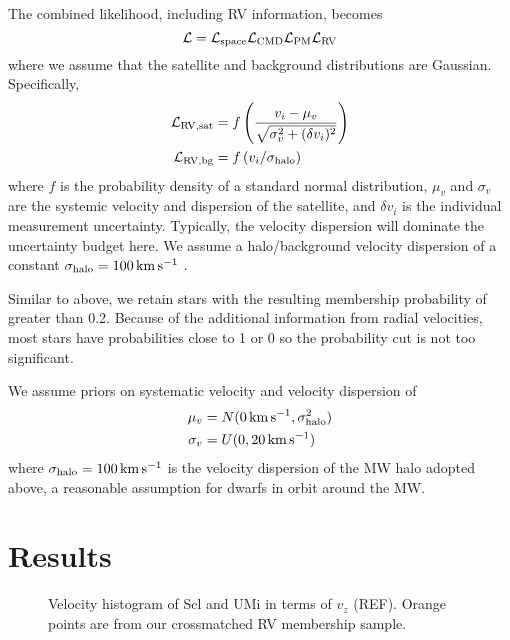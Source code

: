 The combined likelihood, including RV information, becomes
\begin{equation}{
{\cal L} = {\cal L}_{\rm space} {\cal L}_{\rm CMD} {\cal L}_{\rm PM} {\cal L}_{\rm RV}
}\end{equation} where we assume that the satellite and background
distributions are Gaussian. Specifically, \begin{equation}{
\begin{split}
{\cal L}_{\rm RV, sat} &= f\left( \frac{v_i -\mu_{v}}{\sqrt{\sigma_{v}^2 + (\delta v_i)^2}}\right) \\
{\cal L}_{\rm RV, bg} &= f\left( v_i /  \sigma_{\rm halo} \right)
\end{split}
}\end{equation} where \(f\) is the probability density of a standard
normal distribution, \(\mu_v\) and \(\sigma_v\) are the systemic
velocity and dispersion of the satellite, and \(\delta v_i\) is the
individual measurement uncertainty. Typically, the velocity dispersion
will dominate the uncertainty budget here. We assume a halo/background
velocity dispersion of a constant \(\sigma_{\rm halo} = 100\,{\rm km\,s^{-1}}\)
\citep[e.g.][]{brown+2010}.

Similar to above, we retain stars with the resulting membership
probability of greater than 0.2. Because of the additional information
from radial velocities, most stars have probabilities close to 1 or 0 so
the probability cut is not too significant.

We assume priors on systematic velocity and velocity dispersion of
\begin{equation}{
\begin{split}
\mu_{v} &= N(0\,{\rm km\,s^{-1}}, \sigma_{\rm halo}^2) \\ 
\sigma_{v} &= U(0, 20\,{\rm km\,s^{-1}})
\end{split}
}\end{equation} where \(\sigma_{\rm halo} = 100\,{\rm km\,s^{-1}}\) is
the velocity dispersion of the MW halo adopted above, a reasonable
assumption for dwarfs in orbit around the MW.

\section{Results}\label{sec:rv_results}

\begin{figure}
\centering
{}
\caption[LOS velocity fit to Scl.]{Velocity histogram of Scl and UMi in
terms of \(v_z\) (REF). Orange points are from our crossmatched RV
membership sample.}
\end{figure}

